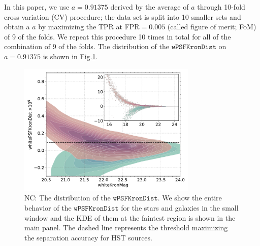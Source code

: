 \documentclass[twocolumn]{aastex62}
\newcommand{\NC}[1]{{\color{brown} NC: {#1}}}
\begin{document}
{In this paper, we use $a=0.91375$ derived by the average of $a$ 
through 10-fold cross variation (CV) procedure;   
the data set is split into 10 smaller sets 
and obtain a $a$ by maximizing the TPR at FPR$ = 0.005$ 
(called figure of merit; FoM) of 9 of the folds. 
We repeat this procedure 10 times in total for all of the combination of 9 of the folds. 
The distribution of the $\mathtt{wPSFKronDist}$ on $a=0.91375$ is shown in Fig.\ref{fig:psfkrondist}. 

\begin{figure}[t]
 \centering
  \includegraphics[width=3.35in, bb = 0 0 576 432]{./Figures/whitePSFKronDist.pdf}
  \caption{
  \NC{The distribution of the $\mathtt{wPSFKronDist}$. 
  We show the entire behavior of the $\mathtt{wPSFKronDist}$ for the stars and galaxies 
  in the small window and the KDE of them at the faintest region is shown in the main panel.  
  The dashed line represents the threshold maximizing the separation accuracy for HST sources. }
 }
  \label{fig:psfkrondist}
\end{figure}
}
\end{document}
